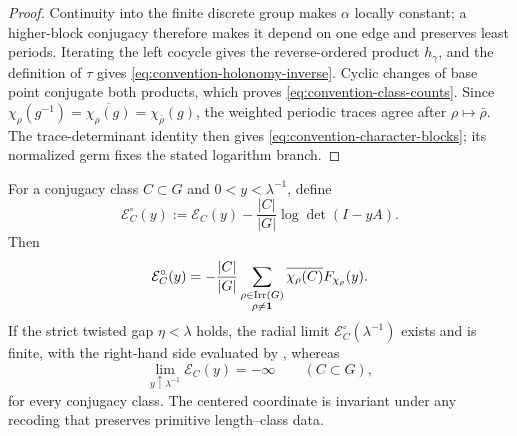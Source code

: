 \begin{proof}
Continuity into the finite discrete group makes \(\alpha\) locally constant;
a higher-block conjugacy therefore makes it depend on one edge and preserves
least periods.  Iterating the left cocycle gives the reverse-ordered product
\(h_\gamma\), and the definition of \(\tau\) gives
\eqref{eq:convention-holonomy-inverse}.  Cyclic changes of base point conjugate
both products, which proves \eqref{eq:convention-class-counts}.  Since
\(\chi_\rho(g^{-1})=\overline{\chi_\rho(g)}=\chi_{\bar\rho}(g)\), the weighted
periodic traces agree after \(\rho\mapsto\bar\rho\).  The trace-determinant
identity then gives \eqref{eq:convention-character-blocks}; its normalized
germ fixes the stated logarithm branch.
\end{proof}

\begin{proposition}
\label{prop:centered-perron-profile}
For a conjugacy class \(C\subset G\) and \(0<y<\lambda^{-1}\), define
\begin{equation}\label{eq:centered-class-profile}
 \mathcal E_C^\circ(y)
 :=\mathcal E_C(y)-\frac{|C|}{|G|}\log\det(I-yA).
\end{equation}
Then
\begin{equation}\label{eq:centered-class-fourier}
 \mathcal E_C^\circ(y)
 =-\frac{|C|}{|G|}
   \sum_{\substack{\rho\in\operatorname{Irr}(G)\\\rho\ne\mathbf1}}
   \overline{\chi_\rho(C)}F_{\chi_\rho}(y).
\end{equation}
If the strict twisted gap \(\eta<\lambda\) holds, the radial limit
\(\mathcal E_C^\circ(\lambda^{-1})\) exists and is finite, with the
right-hand side evaluated by , whereas
\begin{equation}\label{eq:raw-class-profile-divergence}
 \lim_{y\uparrow\lambda^{-1}}\mathcal E_C(y)=-\infty
 \qquad(C\subset G),
\end{equation}
for every conjugacy class.  The centered coordinate is invariant under any
recoding that preserves primitive length--class data.
\end{proposition}

